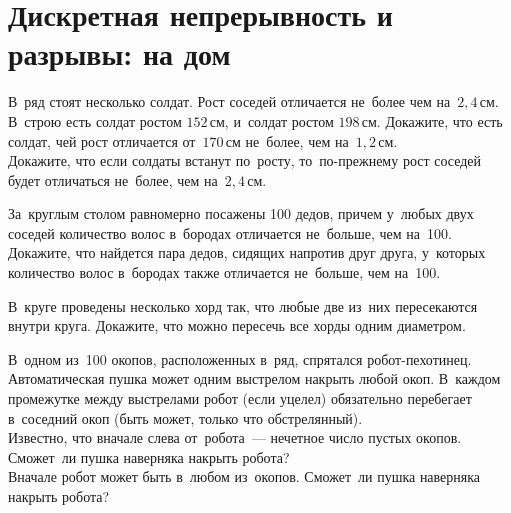 
\section*{Дискретная непрерывность и разрывы: на дом}




\begin{problems}

В~ряд стоят несколько солдат.
Рост соседей отличается не~более чем на~$2{,}4\,\text{см}$.
\\
\sp
В~строю есть солдат ростом $152\,\text{см}$, и~солдат ростом $198\,\text{см}$.
Докажите, что есть солдат, чей рост отличается от~$170\,\text{см}$ не~более, чем
на~$1{,}2\,\text{см}$.
\\
\sp
Докажите, что если солдаты встанут по~росту, то~по-прежнему рост соседей будет
отличаться не~более, чем на~$2{,}4\,\text{см}$.

За~круглым столом равномерно посажены 100 дедов, причем у~любых двух соседей
количество волос в~бородах отличается не~больше, чем на~100.
Докажите, что найдется пара дедов, сидящих напротив друг друга, у~которых
количество волос в~бородах также отличается не~больше, чем на~100.

В~круге проведены несколько хорд так, что любые две из~них пересекаются внутри
круга.
Докажите, что можно пересечь все хорды одним диаметром.

В~одном из~100 окопов, расположенных в~ряд, спрятался робот-пехотинец.
Автоматическая пушка может одним выстрелом накрыть любой окоп.
В~каждом промежутке между выстрелами робот (если уцелел) обязательно перебегает
в~соседний окоп (быть может, только что обстрелянный).
\\
\sp
Известно, что вначале слева от~робота~--- нечетное число пустых окопов.
Сможет~ли пушка наверняка накрыть робота?
\\
\sp
Вначале робот может быть в~любом из~окопов.
Сможет~ли пушка наверняка накрыть робота?

\end{problems}

